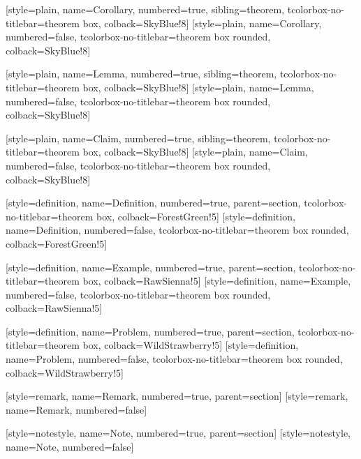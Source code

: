 [style=plain, name=Corollary, numbered=true, sibling=theorem,
    tcolorbox-no-titlebar={theorem box, colback=SkyBlue!8}]
[style=plain, name=Corollary, numbered=false,
    tcolorbox-no-titlebar={theorem box rounded, colback=SkyBlue!8}]

[style=plain, name=Lemma, numbered=true, sibling=theorem,
    tcolorbox-no-titlebar={theorem box, colback=SkyBlue!8}]
[style=plain, name=Lemma, numbered=false,
    tcolorbox-no-titlebar={theorem box rounded, colback=SkyBlue!8}]

[style=plain, name=Claim, numbered=true, sibling=theorem,
    tcolorbox-no-titlebar={theorem box, colback=SkyBlue!8}]
[style=plain, name=Claim, numbered=false,
    tcolorbox-no-titlebar={theorem box rounded, colback=SkyBlue!8}]

[style=definition, name=Definition, numbered=true, parent=section,
    tcolorbox-no-titlebar={theorem box, colback=ForestGreen!5}]
[style=definition, name=Definition, numbered=false,
    tcolorbox-no-titlebar={theorem box rounded, colback=ForestGreen!5}]

[style=definition, name=Example, numbered=true, parent=section,
    tcolorbox-no-titlebar={theorem box, colback=RawSienna!5}]
[style=definition, name=Example, numbered=false,
    tcolorbox-no-titlebar={theorem box rounded, colback=RawSienna!5}]

[style=definition, name=Problem, numbered=true, parent=section,
    tcolorbox-no-titlebar={theorem box, colback=WildStrawberry!5}]
[style=definition, name=Problem, numbered=false,
    tcolorbox-no-titlebar={theorem box rounded, colback=WildStrawberry!5}]

[style=remark, name=Remark, numbered=true, parent=section]
[style=remark, name=Remark, numbered=false]


[style=notestyle, name=Note, numbered=true, parent=section]
[style=notestyle, name=Note, numbered=false]


